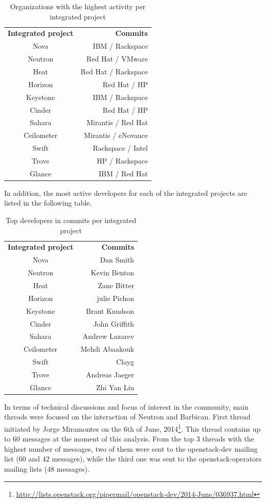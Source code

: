 \documentclass[a4wide,11pt]{report}
\begin{document}
\begin{table}[H]
\centering
\begin{tabular}{c|r|} 
\textbf{Integrated project} & \textbf{Commits} \\
Nova & IBM / Rackspace\\
Neutron & Red Hat / VMware\\
Heat & Red Hat / Rackspace\\
Horizon & Red Hat / HP\\
Keystone & IBM / Rackspace\\
Cinder & Red Hat / HP\\
Sahara & Mirantis / Red Hat\\
Ceilometer & Mirantis / eNovance\\
Swift & Rackspace / Intel\\
Trove & HP / Rackspace\\
Glance & IBM / Red Hat\\
\end{tabular}
\caption{Organizations with the highest activity per integrated project}
\end{table}


In addition, the most active developers for each of the integrated projects are listed in the following table.


\begin{table}[H]
\centering
\begin{tabular}{c|r|} 
\textbf{Integrated project} & \textbf{Commits} \\
Nova & Dan Smith\\
Neutron & Kevin Benton\\
Heat & Zane Bitter\\
Horizon & julie Pichon\\
Keystone & Brant Knudson\\
Cinder & John Griffith\\
Sahara & Andrew Lazarev\\
Ceilometer & Mehdi Abaakouk\\
Swift & Clayg\\
Trove & Andreas Jaeger\\
Glance & Zhi Yan Liu\\
\end{tabular}
\caption{Top developers in commits per integrated project}
\end{table}


In terms of technical discussions and focus of interest in the community, main threads were 
focused on the interaction of Neutron and Barbican. First thread initiated by Jorge Miramontes on the 6th of June,  2014\footnote{\url{http://lists.openstack.org/pipermail/openstack-dev/2014-June/036937.html}}. This thread contains up
to 60 messages at the moment of this analysis. From the top 3 threads with the highest number of messages, two of them were
sent to the openstack-dev mailing list (60 and 42 messages), while the third one was sent to the openstack-operators mailing lists (48 messages).
\end{document}
